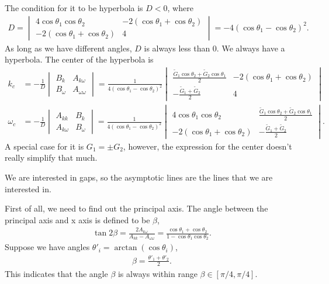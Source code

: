 \documentclass[letterpaper,12pt,english]{sphinxmanual}
\begin{document}
The condition for it to be hyperbola is \(D<0\), where
\begin{equation*}
\begin{split}D = \begin{vmatrix}
4\cos\theta_1\cos\theta_2 & -2(\cos\theta_1+\cos\theta_2) \\
-2(\cos\theta_1+\cos\theta_2)  & 4
\end{vmatrix} = - 4 (\cos\theta_1-\cos\theta_2)^2.\end{split}
\end{equation*}
As long as we have different angles, \(D\) is always less than 0. We always have a hyperbola. The center of the hyperbola is
\begin{equation*}
\begin{split}k_c &= -\frac{1}{D} \begin{vmatrix}
B_k & A_{k\omega} \\
B_\omega & A_{\omega\omega}
\end{vmatrix} = \frac{1}{4 (\cos\theta_1-\cos\theta_2)^2} \begin{vmatrix}
\frac{ \tilde G_1\cos\theta_2 + \tilde G_2\cos\theta_1 }{2} & -2(\cos\theta_1+\cos\theta_2)\\
- \frac{ \tilde G_1 + \tilde G_2 }{2} & 4
\end{vmatrix}   \\
\omega_c &= -\frac{1}{D} \begin{vmatrix}
A_{kk} & B_k \\
A_{k\omega} & B_\omega
\end{vmatrix} = \frac{1}{4 (\cos\theta_1-\cos\theta_2)^2} \begin{vmatrix}
4\cos\theta_1\cos\theta_2 & \frac{ \tilde G_1\cos\theta_2 + \tilde G_2\cos\theta_1 }{2}\\
-2(\cos\theta_1+\cos\theta_2) & - \frac{ \tilde G_1 + \tilde G_2 }{2}
\end{vmatrix}  .\end{split}
\end{equation*}
A special case for it is \(G_1=\pm G_2\), however, the expression for the center doesn't really simplify that much.

We are interested in gaps, so the asymptotic lines are the lines that we are interested in.

First of all, we need to find out the principal axis. The angle between the principal axis and x axis is defined to be \(\beta\),
\begin{equation*}
\begin{split}\tan2 \beta = \frac{2A_{k\omega}}{A_{kk}-A_{\omega\omega}} = \frac{\cos\theta_1+\cos\theta_2}{1-\cos\theta_1\cos\theta_2}.\end{split}
\end{equation*}
Suppose we have angles \(\theta'_i=\arctan ( \cos\theta_i )\),
\begin{equation*}
\begin{split}\beta = \frac{\theta'_1+\theta'_2}{2}.\end{split}
\end{equation*}
This indicates that the angle \(\beta\) is always within range \(\beta \in [\pi/4,\pi/4]\).
\end{document}
